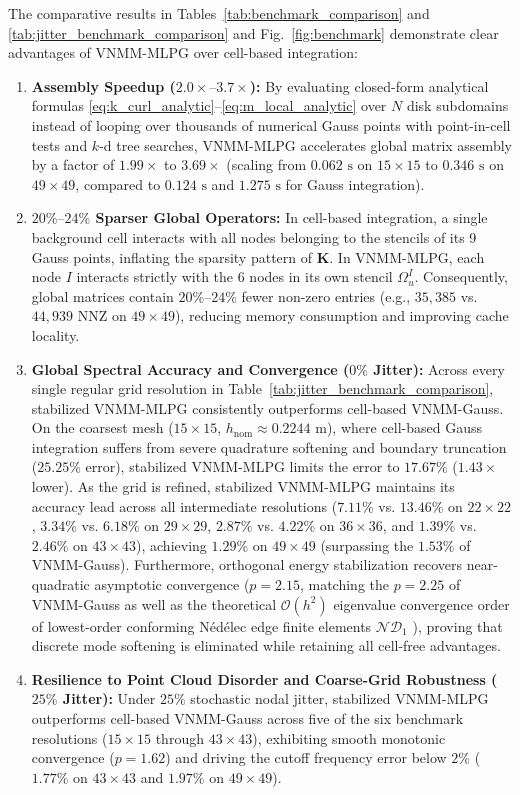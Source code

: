 \documentclass[preprint,12pt]{elsarticle}
\begin{document}
The comparative results in Tables~\ref{tab:benchmark_comparison} and \ref{tab:jitter_benchmark_comparison} and Fig.~\ref{fig:benchmark} demonstrate clear advantages of VNMM-MLPG over cell-based integration:
\begin{enumerate}
    \item \textbf{Assembly Speedup ($2.0\times\text{--}3.7\times$):} By evaluating closed-form analytical formulas \eqref{eq:k_curl_analytic}--\eqref{eq:m_local_analytic} over $N$ disk subdomains instead of looping over thousands of numerical Gauss points with point-in-cell tests and $k$-d tree searches, VNMM-MLPG accelerates global matrix assembly by a factor of $1.99\times$ to $3.69\times$ (scaling from $0.062\text{ s}$ on $15 \times 15$ to $0.346\text{ s}$ on $49 \times 49$, compared to $0.124\text{ s}$ and $1.275\text{ s}$ for Gauss integration).
    \item \textbf{$20\%\text{--}24\%$ Sparser Global Operators:} In cell-based integration, a single background cell interacts with all nodes belonging to the stencils of its 9 Gauss points, inflating the sparsity pattern of $\mathbf{K}$. In VNMM-MLPG, each node $I$ interacts strictly with the 6 nodes in its own stencil $\Omega_u^I$. Consequently, global matrices contain $20\%\text{--}24\%$ fewer non-zero entries (e.g., $35,385$ vs. $44,939$ NNZ on $49 \times 49$), reducing memory consumption and improving cache locality.
    \item \textbf{Global Spectral Accuracy and Convergence ($0\%$ Jitter):} Across every single regular grid resolution in Table~\ref{tab:jitter_benchmark_comparison}, stabilized VNMM-MLPG consistently outperforms cell-based VNMM-Gauss. On the coarsest mesh ($15 \times 15$, $h_{\mathrm{nom}} \approx 0.2244\text{ m}$), where cell-based Gauss integration suffers from severe quadrature softening and boundary truncation ($25.25\%$ error), stabilized VNMM-MLPG limits the error to $17.67\%$ ($1.43\times$ lower). As the grid is refined, stabilized VNMM-MLPG maintains its accuracy lead across all intermediate resolutions ($7.11\%$ vs. $13.46\%$ on $22\times 22$, $3.34\%$ vs. $6.18\%$ on $29\times 29$, $2.87\%$ vs. $4.22\%$ on $36\times 36$, and $1.39\%$ vs. $2.46\%$ on $43\times 43$), achieving $1.29\%$ on $49\times 49$ (surpassing the $1.53\%$ of VNMM-Gauss). Furthermore, orthogonal energy stabilization recovers near-quadratic asymptotic convergence ($p = 2.15$, matching the $p = 2.25$ of VNMM-Gauss as well as the theoretical $\mathcal{O}(h^2)$ eigenvalue convergence order of lowest-order conforming N\'{e}d\'{e}lec edge finite elements $\mathcal{ND}_1$ \cite{nedelec1980mixed, monk2003finite}), proving that discrete mode softening is eliminated while retaining all cell-free advantages.
    \item \textbf{Resilience to Point Cloud Disorder and Coarse-Grid Robustness ($25\%$ Jitter):} Under $25\%$ stochastic nodal jitter, stabilized VNMM-MLPG outperforms cell-based VNMM-Gauss across five of the six benchmark resolutions ($15\times 15$ through $43\times 43$), exhibiting smooth monotonic convergence ($p = 1.62$) and driving the cutoff frequency error below $2\%$ ($1.77\%$ on $43\times 43$ and $1.97\%$ on $49\times 49$). 
    

\end{enumerate}
\end{document}
